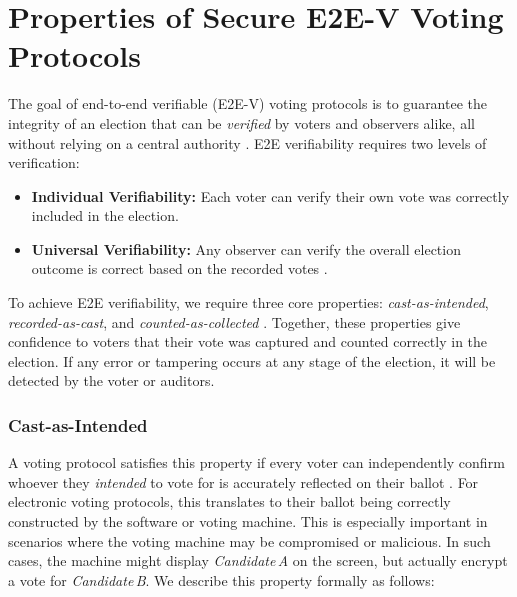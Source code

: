 \section{Properties of Secure E2E-V Voting Protocols}
\label{e2e-v-properties}
The goal of end-to-end verifiable (E2E-V) voting protocols is to guarantee the integrity of an election that can be \emph{verified} by voters and observers alike, all without relying on a central authority \cite{Cha02,kremer2010election,Ben87}.
E2E verifiability requires two levels of verification: 

\begin{itemize}
    \item \textbf{Individual Verifiability:} Each voter can verify their own vote was correctly included in the election.
    \item \textbf{Universal Verifiability:} Any observer can verify the overall election outcome is correct based on the recorded votes \cite{DBLP:journals/corr/AliM16}.
\end{itemize}

To achieve E2E verifiability, we require three core properties: \emph{cast-as-intended}, \emph{recorded-as-cast}, and \emph{counted-as-collected} \cite{regenscheid-e2e-vvsg2-tgdc-2023}.
Together, these properties give confidence to voters that their vote was captured and counted correctly in the election.  
If any error or tampering occurs at any stage of the election, it will be detected by the voter or auditors. 

\subsubsection{Cast-as-Intended}
A voting protocol satisfies this property if every voter can independently confirm whoever they \emph{intended} to vote for is accurately reflected on their ballot \cite{RonneRyanSmyth2021}. 
For electronic voting protocols, this translates to their ballot being correctly constructed by the software or voting machine.
This is especially important in scenarios where the voting machine may be compromised or malicious.
In such cases, the machine might display \emph{Candidate\,A} on the screen, but actually encrypt a vote for \emph{Candidate\,B}.
We describe this property formally as follows:

